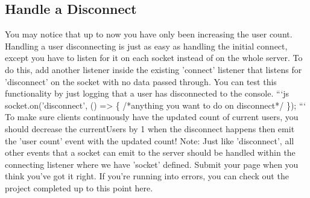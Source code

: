 \documentclass{article}%
\begin{document}
%
\subsection{Handle a Disconnect}%
\label{subsec:HandleaDisconnect}%
You may notice that up to now you have only been increasing the user count. Handling a user disconnecting is just as easy as handling the initial connect, except you have to listen for it on each socket instead of on the whole server.\newline%
To do this, add another listener inside the existing 'connect' listener that listens for 'disconnect' on the socket with no data passed through. You can test this functionality by just logging that a user has disconnected to the console.\newline%
```js\newline%
socket.on('disconnect', () => \{\newline%
  /*anything you want to do on disconnect*/\newline%
\});\newline%
```\newline%
To make sure clients continuously have the updated count of current users, you should decrease the currentUsers by 1 when the disconnect happens then emit the 'user count' event with the updated count!\newline%
Note: Just like 'disconnect', all other events that a socket can emit to the server should be handled within the connecting listener where we have 'socket' defined.\newline%
Submit your page when you think you've got it right. If you're running into errors, you can check out the project completed up to this point here.\newline%

%
\end{document}
